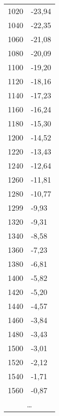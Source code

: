 \begin{table}[h]
\begin{tabular}{rl}
1020	&	-23,94\\
1040	&	-22,35\\
1060	&	-21,08\\
1080	&	-20,09\\
1100	&	-19,20\\
1120	&	-18,16\\
1140	&	-17,23\\
1160	&	-16,24\\
1180	&	-15,30\\
1200	&	-14,52\\
1220	&	-13,43\\
1240	&	-12,64\\
1260	&	-11,81\\
1280	&	-10,77\\
1299	&	-9,93\\
1320	&	-9,31\\
1340	&	-8,58\\
1360	&	-7,23\\
1380	&	-6,81\\
1400	&	-5,82\\
1420	&	-5,20\\
1440	&	-4,57\\
1460	&	-3,84\\
1480	&	-3,43\\
1500	&	-3,01\\
1520	&	-2,12\\
1540	&	-1,71\\
1560	&	-0,87\\
\multicolumn{2}{c}{\dots}\\
\end{tabular}
\begin{tabular}{c|c}

\end{tabular}
\end{table}
